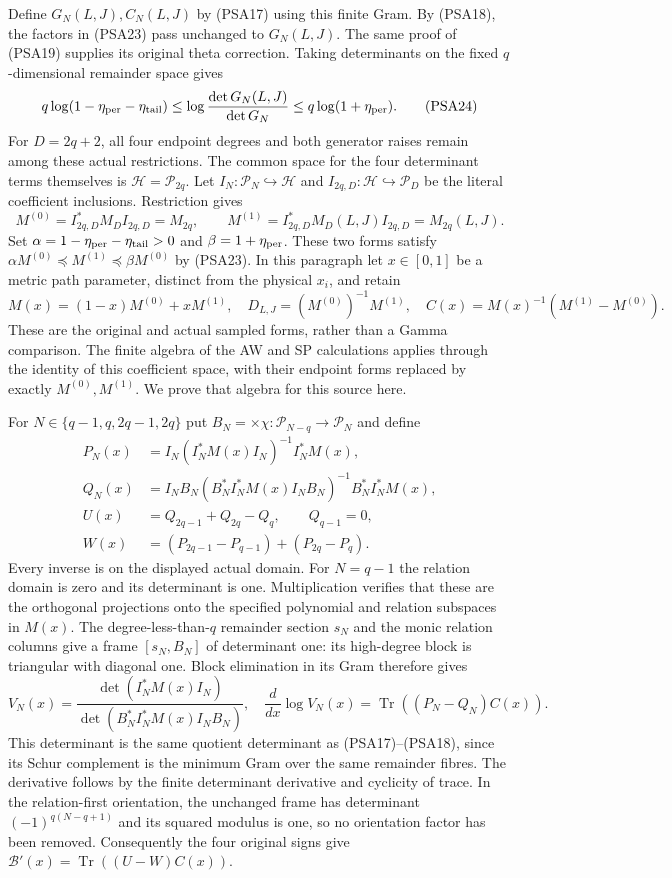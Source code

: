 Define $G_N(L,J),C_N(L,J)$ by (PSA17) using this finite Gram.
By (PSA18), the factors in (PSA23) pass unchanged to $G_N(L,J)$.
The same proof of (PSA19) supplies its original theta correction.
Taking determinants on the fixed $q$-dimensional remainder space gives
\[
 q\log(1-\eta_{\rm per}-\eta_{\rm tail})
 \le\log\frac{\det G_N(L,J)}{\det G_N}
 \le q\log(1+\eta_{\rm per}).
 \tag{PSA24}
\]
For $D=2q+2$, all four endpoint degrees and both generator raises
remain among these actual restrictions. The common space for the
four determinant terms themselves is $\mathcal H=\mathcal P_{2q}$.
Let $I_N:\mathcal P_N\hookrightarrow\mathcal H$ and
$I_{2q,D}:\mathcal H\hookrightarrow\mathcal P_D$ be the literal
coefficient inclusions. Restriction gives
\[
 M^{(0)}=I_{2q,D}^*M_DI_{2q,D}=M_{2q},\qquad
 M^{(1)}=I_{2q,D}^*M_D(L,J)I_{2q,D}=M_{2q}(L,J).
 \tag{PSA24a}
\]
Set $\alpha=1-\eta_{\rm per}-\eta_{\rm tail}>0$ and
$\beta=1+\eta_{\rm per}$. These two forms satisfy
$\alpha M^{(0)}\preceq M^{(1)}\preceq\beta M^{(0)}$ by
(PSA23). In this paragraph let $x\in[0,1]$ be a metric path
parameter, distinct from the physical $x_i$, and retain
\[
 M(x)=(1-x)M^{(0)}+xM^{(1)},\quad
 D_{L,J}=(M^{(0)})^{-1}M^{(1)},\quad
 C(x)=M(x)^{-1}(M^{(1)}-M^{(0)}).
 \tag{PSA24b}
\]
These are the original and actual sampled forms, rather than a
Gamma comparison. The finite algebra of the AW and SP calculations
applies through the identity of this coefficient space, with their
endpoint forms replaced by exactly $M^{(0)},M^{(1)}$.
We prove that algebra for this source here.

For $N\in\{q-1,q,2q-1,2q\}$ put
$B_N=\times\chi:\mathcal P_{N-q}\to\mathcal P_N$ and define
\[
 \begin{aligned}
 P_N(x)&=I_N(I_N^*M(x)I_N)^{-1}I_N^*M(x),\\
 Q_N(x)&=I_NB_N(B_N^*I_N^*M(x)I_NB_N)^{-1}
                             B_N^*I_N^*M(x),\\
 U(x)&=Q_{2q-1}+Q_{2q}-Q_q,\qquad Q_{q-1}=0,\\
 W(x)&=(P_{2q-1}-P_{q-1})+(P_{2q}-P_q).
 \end{aligned}
 \tag{PSA24c}
\]
Every inverse is on the displayed actual domain. For $N=q-1$
the relation domain is zero and its determinant is one.
Multiplication verifies that these are the orthogonal projections
onto the specified polynomial and relation subspaces in $M(x)$.
The degree-less-than-$q$ remainder section $s_N$ and the monic
relation columns give a frame $[s_N,B_N]$ of determinant one:
its high-degree block is triangular with diagonal one.
Block elimination in its Gram therefore gives
\[
 V_N(x)=\frac{\det(I_N^*M(x)I_N)}
                  {\det(B_N^*I_N^*M(x)I_NB_N)},\quad
 \frac{d}{dx}\log V_N(x)=\operatorname{Tr}((P_N-Q_N)C(x)).
 \tag{PSA24d}
\]
This determinant is the same quotient determinant as (PSA17)--(PSA18),
since its Schur complement is the minimum Gram over the same
remainder fibres. The derivative follows by the finite determinant
derivative and cyclicity of trace. In the relation-first orientation,
the unchanged frame has determinant $(-1)^{q(N-q+1)}$ and its
squared modulus is one, so no orientation factor has been removed.
Consequently the four original signs give
$\mathcal B'(x)=\operatorname{Tr}((U-W)C(x))$.

